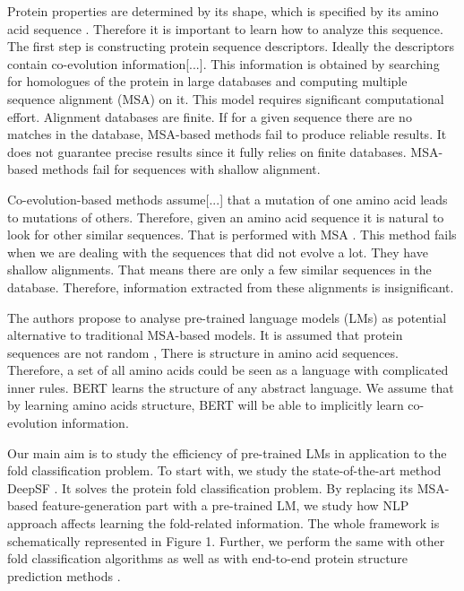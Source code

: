 \documentclass[12pt, twoside]{article}
\begin{document}
Protein properties are determined by its shape, which is specified by its amino acid sequence \cite{cellbiology}. Therefore it is important to learn how to analyze this sequence.
The first step is constructing protein sequence descriptors. Ideally the descriptors contain co-evolution information[...]. This information is obtained by searching for homologues of the protein in large databases and computing multiple sequence alignment (MSA) on it. This model requires significant computational effort. Alignment databases are finite. If for a given sequence there are no matches in the database, MSA-based methods fail to produce reliable results. 
 It does not guarantee precise results since it fully relies on finite databases. MSA-based methods fail for sequences with shallow alignment.

 Co-evolution-based methods assume[...] that a mutation of one amino acid leads to mutations of others. Therefore, given an amino acid sequence it is natural to look for other similar sequences. That is performed with MSA \cite{co-evolution}. This method fails when we are dealing with the sequences that did not evolve a lot. They have shallow alignments. That means there are only a few similar sequences in the database. Therefore, information extracted from these alignments is insignificant. 

The authors propose to analyse pre-trained language models (LMs)  \cite{Elnaggar} as potential alternative to traditional MSA-based models. It is assumed that protein sequences are not random \cite{evolution-not-random}, There is structure in amino acid sequences. Therefore, a set of all amino acids could be seen as a language with complicated inner rules. BERT \cite{bert} learns the structure of any abstract language. We assume that by learning amino acids structure, BERT will be able to implicitly learn co-evolution information.

Our main aim is to study the efficiency of pre-trained LMs in application to the fold classification problem.  To start with, we study the state-of-the-art method DeepSF \cite{DeepSF}. It solves the protein fold classification problem.  By replacing its MSA-based feature-generation part with a pre-trained LM, we study how NLP approach affects learning the fold-related information.  The whole framework is schematically represented in Figure 1. Further, we perform the same with other fold classification algorithms \cite{Villegas, DeepFrag}
as well as with end-to-end protein structure prediction methods \cite{Kandathil, Xu2020.10.12.336859}.
\end{document}
